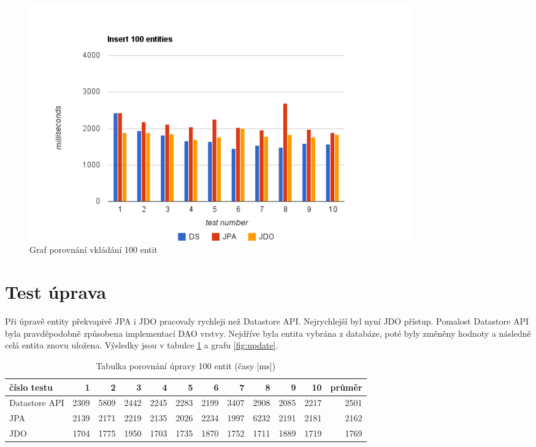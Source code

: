 \begin{figure}[h]
\begin{center}
\includegraphics[width=6.5in]{figures/insert.png}
\caption{Graf porovnání vkládání 100 entit}
\label{fig:insert}
\end{center}
\end{figure}

\section{Test úprava}

Při úpravě entity překvapivě JPA i JDO pracovaly rychleji než Datastore API. Nejrychlejší byl nyní JDO přístup. Pomalost Datastore API byla pravděpodobně způsobena implementací DAO vrstvy. Nejdříve byla entita vybrána z databáze, poté byly změněny hodnoty a následně celá entita znovu uložena. Výsledky jsou v tabulce \ref{tab:update} a grafu \ref{fig:update}.

\begin{table}[h]
\centering
\caption[Tabulka porovnání úpravy 100 entit]{Tabulka porovnání úpravy 100 entit  (časy [ms])}\label{tab:update}
\begin{tabular}{|l|r|r|r|r|r|r|r|r|r|r|r|}
   \hline
číslo testu	& 1		& 2		& 3		& 4		& 5		& 6		& 7		& 8		& 9		& 10		& průměr \\
   \hline
Datastore API	& 2309	& 5809	& 2442	& 2245	& 2283	& 2199	& 3407	& 2908	& 2085	& 2217	& 2501 \\
JPA	& 2139	& 2171	& 2219	& 2135	& 2026	& 2234	& 1997	& 6232	& 2191	& 2181	& 2162 \\
JDO	& 1704	& 1775	& 1950	& 1703	& 1735	& 1870	& 1752	& 1711	& 1889	& 1719	& 1769 \\
   \hline
\end{tabular}
\end{table}

